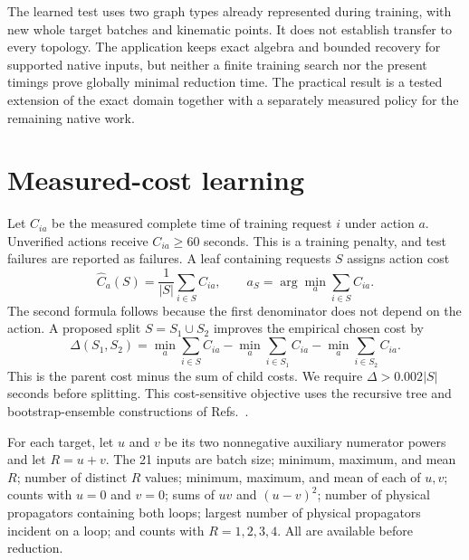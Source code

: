 \documentclass[11pt,a4paper]{article}
\begin{document}
The learned test uses two graph types already represented during training, with new whole target batches and kinematic points. It does not establish transfer to every topology. The application keeps exact algebra and bounded recovery for supported native inputs, but neither a finite training search nor the present timings prove globally minimal reduction time. The practical result is a tested extension of the exact domain together with a separately measured policy for the remaining native work.
\FloatBarrier

\section{Measured-cost learning}
\label{notes-light-app:shared}
Let $C_{ia}$ be the measured complete time of training request $i$ under action $a$. Unverified actions receive $C_{ia}\geq60$ seconds. This is a training penalty, and test failures are reported as failures. A leaf containing requests $S$ assigns action cost
\begin{equation}
 \widehat C_a(S)=\frac{1}{|S|}\sum_{i\in S}C_{ia},\qquad
 a_S=\arg\min_a\sum_{i\in S}C_{ia}.
 \label{notes-light-eq:cost-leaf}
\end{equation}
The second formula follows because the first denominator does not depend on the action. A proposed split $S=S_1\cup S_2$ improves the empirical chosen cost by
\begin{equation}
 \Delta(S_1,S_2)=\min_a\sum_{i\in S}C_{ia}
 -\min_a\sum_{i\in S_1}C_{ia}
 -\min_a\sum_{i\in S_2}C_{ia}.
 \label{notes-light-eq:cost-split}
\end{equation}
This is the parent cost minus the sum of child costs. We require $\Delta>0.002|S|$ seconds before splitting. This cost-sensitive objective uses the recursive tree and bootstrap-ensemble constructions of Refs.~\cite{CART1984,Breiman2001Forest}.

For each target, let $u$ and $v$ be its two nonnegative auxiliary numerator powers and let $R=u+v$. The 21 inputs are batch size; minimum, maximum, and mean $R$; number of distinct $R$ values; minimum, maximum, and mean of each of $u,v$; counts with $u=0$ and $v=0$; sums of $uv$ and $(u-v)^2$; number of physical propagators containing both loops; largest number of physical propagators incident on a loop; and counts with $R=1,2,3,4$. All are available before reduction.
\end{document}
